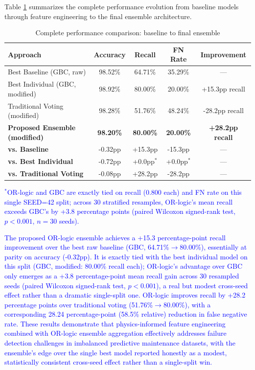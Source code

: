 \documentclass[final,5p, twocolumn]{elsarticle}
\begin{document}
Table \ref{tab:final_comparison} summarizes the complete performance evolution from baseline models through feature engineering to the final ensemble architecture.

\begin{table}[htbp]
\centering
\caption{Complete performance comparison: baseline to final ensemble}
\label{tab:final_comparison}
\small
\begin{tabular}{lcccc}
\hline
\textbf{Approach} & \textbf{Accuracy} & \textbf{Recall} & \textbf{FN Rate} & \textbf{Improvement} \\
\hline
Best Baseline (GBC, raw) & 98.52\% & 64.71\% & 35.29\% & --- \\
Best Individual (GBC, modified) & 98.92\% & 80.00\% & 20.00\% & +15.3pp recall \\
Traditional Voting (modified) & 98.28\% & 51.76\% & 48.24\% & -28.2pp recall \\
\textbf{Proposed Ensemble (modified)} & \textbf{98.20\%} & \textbf{80.00\%} & \textbf{20.00\%} & \textbf{+28.2pp recall} \\
\hline
\textbf{vs. Baseline} & -0.32pp & +15.3pp & -15.3pp & --- \\
\textbf{vs. Best Individual} & -0.72pp & +0.0pp$^{*}$ & +0.0pp$^{*}$ & --- \\
\textbf{vs. Traditional Voting} & -0.08pp & +28.2pp & -28.2pp & --- \\
\hline
\end{tabular}
\end{table}

\textcolor{blue}{$^{*}$OR-logic and GBC are exactly tied on recall (0.800 each) and FN rate on this single SEED=42 split; across 30 stratified resamples, OR-logic's mean recall exceeds GBC's by +3.8 percentage points (paired Wilcoxon signed-rank test, $p<0.001$, $n=30$ seeds).}

\textcolor{blue}{The proposed OR-logic ensemble achieves a +15.3 percentage-point recall improvement over the best raw baseline (GBC, 64.71\%$\to$80.00\%), essentially at parity on accuracy (-0.32pp). It is exactly tied with the best individual model on this split (GBC, modified: 80.00\% recall each); OR-logic's advantage over GBC only emerges as a +3.8 percentage-point mean recall gain across 30 resampled seeds (paired Wilcoxon signed-rank test, $p<0.001$), a real but modest cross-seed effect rather than a dramatic single-split one. OR-logic improves recall by +28.2 percentage points over traditional voting (51.76\%$\to$80.00\%), with a corresponding 28.24 percentage-point (58.5\% relative) reduction in false negative rate. These results demonstrate that physics-informed feature engineering combined with OR-logic ensemble aggregation effectively addresses failure detection challenges in imbalanced predictive maintenance datasets, with the ensemble's edge over the single best model reported honestly as a modest, statistically consistent cross-seed effect rather than a single-split win.}
\end{document}
